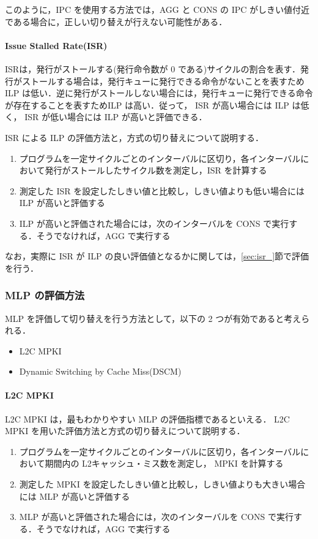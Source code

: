 \documentclass[twocolumn]{jsarticle}
\begin{document}
  このように，IPC を使用する方法では，AGG と CONS の IPC がしきい値付近である場合に，正しい切り替えが行えない可能性がある．

  \paragraph{Issue Stalled Rate(ISR)}
  ISRは，発行がストールする(発行命令数が 0 である)サイクルの割合を表す．発行がストールする場合は，発行キューに発行できる命令がないことを表すためILP は低い．逆に発行がストールしない場合には，発行キューに発行できる命令が存在することを表すためILP は高い．従って， ISR が高い場合には ILP は低く， ISR が低い場合には ILP が高いと評価できる．

  ISR による ILP の評価方法と，方式の切り替えについて説明する．
  \begin{enumerate}
    \item プログラムを一定サイクルごとのインターバルに区切り，各インターバルにおいて発行がストールしたサイクル数を測定し，ISR を計算する
    \item 測定した ISR を設定したしきい値と比較し，しきい値よりも低い場合には ILP が高いと評価する
    \item ILP が高いと評価された場合には，次のインターバルを CONS で実行する．そうでなければ，AGG で実行する
  \end{enumerate}

  なお，実際に ISR が ILP の良い評価値となるかに関しては，\ref{sec:isr_}節で評価を行う．

  \subsubsection{MLP の評価方法}
  MLP を評価して切り替えを行う方法として，以下の 2 つが有効であると考えられる．
  \begin{itemize}
    \item L2C MPKI
    \item Dynamic Switching by Cache Miss(DSCM)
  \end{itemize}

  \paragraph{L2C MPKI}
  L2C MPKI は，最もわかりやすい MLP の評価指標であるといえる． L2C MPKI を用いた評価方法と方式の切り替えについて説明する．
  \begin{enumerate}
    \item プログラムを一定サイクルごとのインターバルに区切り，各インターバルにおいて期間内の L2キャッシュ・ミス数を測定し， MPKI を計算する
    \item 測定した MPKI を設定したしきい値と比較し，しきい値よりも大きい場合には MLP が高いと評価する
    \item MLP が高いと評価された場合には，次のインターバルを CONS で実行する．そうでなければ，AGG で実行する
  \end{enumerate}
\end{document}
